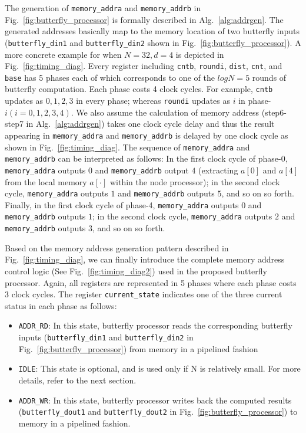 \documentclass{iacrtrans}
\theoremstyle{plain}
\begin{document}
The generation of \texttt{memory\_addra} and \texttt{memory\_addrb} in Fig.~\ref{fig:butterfly_processor} is formally described in Alg.~\ref{alg:addrgen}. The generated addresses basically map to the memory location of two butterfly inputs (\texttt{butterfly\_din1} and  \texttt{butterfly\_din2} shown in Fig.~\ref{fig:butterfly_processor}). A more concrete example for when $N=32,d=4$ is depicted in Fig.~\ref{fig:timing_diag}. Every register including \texttt{cntb}, \texttt{roundi}, \texttt{dist}, \texttt{cnt}, and \texttt{base} has 5 phases each of which corresponds to one of the $logN=5$ rounds of butterfly computation. Each phase costs 4 clock cycles. For example, \texttt{cntb} updates as $0,1,2,3$ in every phase; whereas \texttt{roundi} updates as $i$ in phase-$i(i=0,1,2,3,4)$. We also assume the calculation of memory address (step6-step7 in Alg.~\ref{alg:addrgen}) takes one clock cycle delay and thus the result appearing in \texttt{memory\_addra} and \texttt{memory\_addrb} is delayed by one clock cycle as shown in Fig.~\ref{fig:timing_diag}. The sequence of \texttt{memory\_addra} and \texttt{memory\_addrb} can be interpreted as follows: In the first clock cycle of phase-0, \texttt{memory\_addra} outputs $0$ and \texttt{memory\_addrb} output $4$ (extracting $a[0]$ and $a[4]$ from the local memory $a[\cdot]$ within the node processor); in the second clock cycle, \texttt{memory\_addra} outputs $1$ and \texttt{memory\_addrb} outputs $5$, and so on so forth. Finally, in the first clock cycle of phase-4, \texttt{memory\_addra} outputs $0$ and \texttt{memory\_addrb} outputs $1$; in the second clock cycle, \texttt{memory\_addra} outputs $2$ and \texttt{memory\_addrb} outputs $3$, and so on so forth. 


Based on the memory address generation pattern described in Fig.~\ref{fig:timing_diag}, we can finally introduce the complete memory address control logic (See Fig.~\ref{fig:timing_diag2}) used in the proposed butterfly processor. Again, all registers are represented in 5 phases where each phase costs 3 clock cycles. The register \texttt{current\_state} indicates one of the three current status in each phase as follows:
\begin{itemize}
    \item \texttt{ADDR\_RD}: In this state, butterfly processor reads the corresponding butterfly inputs (\texttt{butterfly\_din1} and \texttt{butterfly\_din2} in Fig.~\ref{fig:butterfly_processor}) from memory in a pipelined fashion
    \item \texttt{IDLE}: This state is optional, and is used only if N is relatively small. For more details, refer to the next section.
    \item \texttt{ADDR\_WR}: In this state, butterfly processor writes back the computed results (\texttt{butterfly\_dout1} and \texttt{butterfly\_dout2} in Fig.~\ref{fig:butterfly_processor}) to memory in a pipelined fashion.
\end{itemize}
\end{document}
